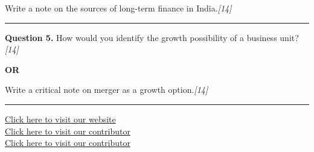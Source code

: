 \documentclass[11pt,a4paper]{article}
\newcommand{\pts}[1]{\hfill   \textit{[#1]}}
\begin{document}
Write a note on the sources of long-term finance in India.\pts{14}

\medskip\rule{\linewidth}{0.2pt}




\noindent   \textbf{Question 5.}
How would you identify the growth possibility of a business unit?\pts{14}

\centerline{   \textbf{OR}}

Write a critical note on merger as a growth option.\pts{14}

\vfill
\rule{\linewidth}{0.4pt}

\begin{center}\small
\href{https://bhu-exam.vercel.app/}{Click here to visit our website}\\[4pt]
\href{https://me-aryan.vercel.app/}{Click here to visit our contributor}\\[4pt]
\href{https://quashan-me.vercel.app/}{Click here to visit our contributor}
\end{center}
\end{document}
